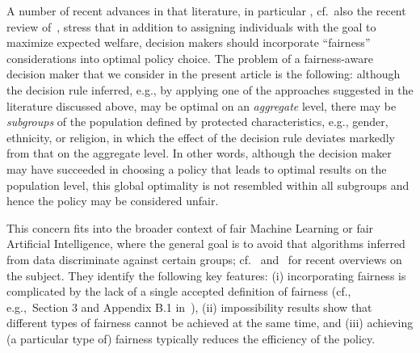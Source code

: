 \documentclass[11pt, a4paper]{article}
\theoremstyle{definition}
\begin{document}
A number of recent advances in that literature, in particular \cite{kleinberg2018}, cf.~also the recent review of~\cite{cowgill2019economics}, stress that in addition to assigning individuals with the goal to maximize expected welfare, decision makers should incorporate ``fairness'' considerations into optimal policy choice. The problem of a fairness-aware decision maker that we consider in the present article is the following: although the decision rule inferred, e.g., by applying one of the approaches suggested in the literature discussed above, may be optimal on an \emph{aggregate} level, there may be \emph{subgroups} of the population defined by protected characteristics, e.g., gender, ethnicity, or religion, in which the effect of the decision rule deviates markedly from that on the aggregate level. In other words, although the decision maker may have succeeded in choosing a policy that leads to optimal results on the population level, this global optimality is not resembled within all subgroups and hence the policy may be considered unfair. 

This concern fits into the broader context of fair Machine Learning or fair Artificial Intelligence, where the general goal is to avoid that algorithms inferred from data discriminate against certain groups; cf.~\cite{corbett2018measure} and~\cite{pessach} for recent overviews on the subject. They identify the following key features: (i) incorporating fairness is complicated by the lack of a single accepted definition of fairness (cf., e.g.,~Section 3 and Appendix B.1 in~\cite{pessach}), (ii) impossibility results show that different types of fairness cannot be achieved at the same time, and (iii) achieving (a particular type of) fairness typically reduces the efficiency of the policy.
\end{document}
